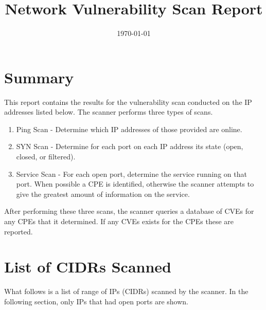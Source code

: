 \documentclass{article}
\title{Network Vulnerability Scan Report\\}
\date{\today}
\begin{document}
\maketitle

\section{Summary}
This report contains the results for the vulnerability scan conducted on the IP addresses listed below. The scanner performs three types of scans. 
\begin{enumerate}
    \item Ping Scan - Determine which IP addresses of those provided are online.
    \item SYN Scan - Determine for each port on each IP address its state (open, closed, or filtered).
    \item Service Scan - For each open port, determine the service running on that port. When possible a CPE is identified, otherwise the scanner attempts to give the greatest amount of information on the service.
\end{enumerate}

After performing these three scans, the scanner queries a database of CVEs for any CPEs that it determined. If any CVEs exists for the CPEs these are reported.

\section{List of CIDRs Scanned}
What follows is a list of range of IPs (CIDRs) scanned by the scanner. In the following section, only IPs that had open ports are shown.
\end{document}
